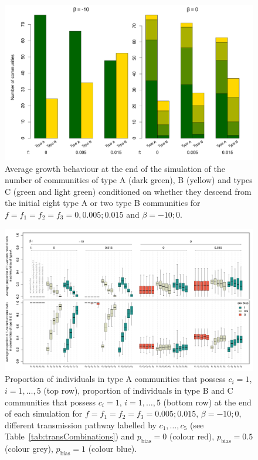 \documentclass[9pt,twocolumn,twoside,lineno]{pnas-new}
\begin{document}
\begin{figure}[htb]
\begin{center}
\includegraphics[width=14.0cm]{Figs/Figure2.pdf}
\end{center}
\caption{Average growth behaviour at the end of the simulation of the number of communities of type A (dark green), B (yellow) and types C (green and light green) conditioned on whether they descend from the initial eight type A or two type B communities for $f=f_1=f_2=f_3=0,0.005;0.015$ and $\beta=-10;0$. } 
\label{fig:growthbehaviour_rho0}       
\end{figure}

\begin{figure}
\includegraphics[width=17.0cm]{Figs/Figure3.pdf}
\caption{Proportion of individuals in type A communities that possess $c_i=1$, $i=1,\ldots,5$ (top row), proportion of individuals in type B and C communities that possess $c_i=1$, $i=1,\ldots,5$ (bottom row) at the end of each simulation for $f=f_1=f_2=f_3=0.005;0.015$, $\beta=-10;0$, different transmission pathway labelled by $c_1,\ldots,c_5$ (see Table~\ref{tab:transCombinations}) and $p_\text{bias}=0$ (colour red), $p_\text{bias}=0.5$ (colour grey), $p_\text{bias}=1$ (colour blue).} \label{fig:meanProportion_rho0}       
\end{figure}
\end{document}
